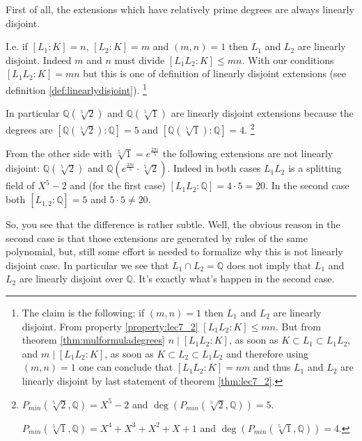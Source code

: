 \begin{example}
  First of all, the extensions which have relatively prime degrees are
  always linearly disjoint.

  I.e. if $\left[L_1 : K\right] = n$, $\left[L_2 : K\right] = m$ and
  $\left(m, n\right) = 1$ then $L_1$ and $L_2$ are linearly
  disjoint. Indeed $m$ and $n$ must divide $\left[L_1 L_2 : K\right]
  \le m n$. With our conditions $\left[L_1 L_2 : K\right] = m n$ but
  this is one of definition of linearly disjoint extensions
  (see definition \ref{def:linearlydisjoint}).
  \footnote{
    The claim is the following: if $\left(m, n\right) = 1$ then $L_1$
    and $L_2$ are linearly disjoint. From
    property \ref{property:lec7_2} $\left[L_1 L_2 : K\right] \le m
    n$. But from theorem 
    \ref{thm:mulformuladegrees} $n \mid \left[L_1 L_2 : K\right]$, as
    soon as $K \subset L_1 \subset L_1 L_2$, and
    $m \mid \left[L_1 L_2 : K\right]$, as
    soon as $K \subset L_2 \subset L_1 L_2$ and therefore using
    $\left(m, n\right) = 1$ one can conclude that $\left[L_1 L_2 :
      K\right] = nm$ and thus $L_1$  and $L_2$ are linearly
    disjoint by last statement of theorem \ref{thm:lec7_2}. 
  }

  In particular $\mathbb{Q}\left(\sqrt[5]{2}\right)$ and
  $\mathbb{Q}\left(\sqrt[5]{1}\right)$ are linearly disjoint
  extensions because the degrees are
  $\left[\mathbb{Q}\left(\sqrt[5]{2}\right): \mathbb{Q}\right] = 5$
  and
  $\left[\mathbb{Q}\left(\sqrt[5]{1}\right): \mathbb{Q}\right] = 4$.
  \footnote{
    $P_{min}\left(\sqrt[5]{2}, \mathbb{Q}\right) = X^5 - 2$ and
    $\deg\left(P_{min}\left(\sqrt[5]{2}, \mathbb{Q}\right)\right) =
    5$.

    $P_{min}\left(\sqrt[5]{1}, \mathbb{Q}\right) = X^4 + X^3 + X^2 + X
    + 1$ and
    $\deg\left(P_{min}\left(\sqrt[5]{1}, \mathbb{Q}\right)\right) =
    4$.
  }

  From the other side with $\sqrt[5]{1} = e^{\frac{2 \pi i}{5}}$ the
  following extensions are not linearly disjoint:
  $\mathbb{Q}\left(\sqrt[5]{2}\right)$ and
  $\mathbb{Q}\left(e^{\frac{2 \pi i}{5}} \cdot
  \sqrt[5]{2}\right)$.
  Indeed in both cases $L_1 L_2$ is a splitting
  field of $X^5 - 2$ and (for the first case) $\left[L_1 L_2 :
    \mathbb{Q}\right] = 4 \cdot 5 = 20$. In the second case both
  $\left[L_{1,2}:\mathbb{Q}\right] = 5$ and $5 \cdot 5 \ne 20$.

   So, you see that the difference is rather subtle. Well, the obvious
   reason in the second case is that those extensions are generated by
   rules of the same polynomial, but, still some effort is needed to
   formalize why this is not linearly disjoint case.
   In particular we see that $L_1 \cap L_2 = \mathbb{Q}$ does not
   imply that $L_1$ and $L_2$ are linearly disjoint over
   $\mathbb{Q}$. It's exactly what's happen in the second case. 
\end{example}

